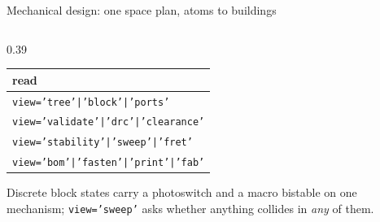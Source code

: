 \documentclass[aspectratio=169,10pt]{beamer}
\begin{document}
\begin{frame}{Mechanical design: one space plan, atoms to buildings}
\begin{columns}[T]
\begin{column}{0.39\textwidth}
      \vspace{1ex}
      {\color{LightText}%
      \begin{tabular}{@{}l@{}}
        \toprule
        \textbf{read} \\
        \midrule
        \texttt{view='tree'|'block'|'ports'} \\
        \texttt{view='validate'|'drc'|'clearance'} \\
        \texttt{view='stability'|'sweep'|'fret'} \\
        \texttt{view='bom'|'fasten'|'print'|'fab'} \\
        \bottomrule
      \end{tabular}}

      \vspace{0.6ex}
      \tiny\textcolor{MutedGray}{Discrete block states carry a photoswitch and
      a macro bistable on one mechanism; \texttt{view='sweep'} asks whether
      anything collides in \emph{any} of them.}
    \end{column}
  \end{columns}
\end{frame}
\end{document}
